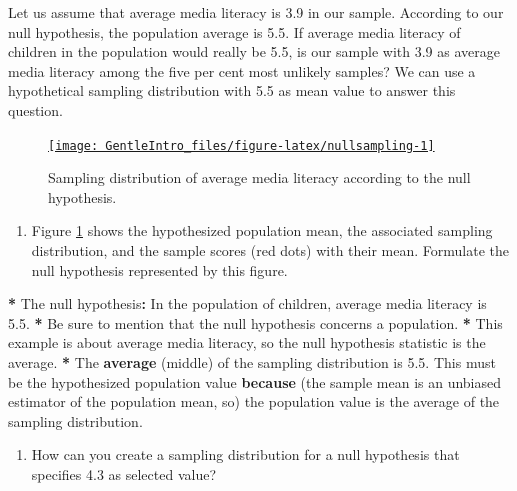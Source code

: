 \documentclass[a4paper]{book}
\newenvironment{Shaded}{\begin{snugshade}}{\end{snugshade}}
\newcommand{\KeywordTok}[1]{\textcolor[rgb]{0,0,0}{\textbf{#1}}}
\newcommand{\FloatTok}[1]{\textcolor[rgb]{0.00,0.00,0.00}{#1}}
\newcommand{\StringTok}[1]{\textcolor[rgb]{0.00,0.00,0.00}{#1}}
\newcommand{\OperatorTok}[1]{\textcolor[rgb]{0.00,0.00,0.00}{\textbf{#1}}}
\newcommand{\NormalTok}[1]{#1}
\providecommand{\tightlist}{%
  \setlength{\itemsep}{0pt}\setlength{\parskip}{0pt}}
\theoremstyle{definition}
\theoremstyle{definition}
\theoremstyle{definition}
\theoremstyle{remark}
\begin{document}
Let us assume that average media literacy is 3.9 in our sample.
According to our null hypothesis, the population average is 5.5. If
average media literacy of children in the population would really be
5.5, is our sample with 3.9 as average media literacy among the five per
cent most unlikely samples? We can use a hypothetical sampling
distribution with 5.5 as mean value to answer this question.

\begin{figure}[H]
\href{http://82.196.4.233:3838/apps/nullsampling/}{\texttt{[image: GentleIntro\_files/figure-latex/nullsampling-1]} }\caption{Sampling distribution of average media literacy according to the null hypothesis.}\label{fig:nullsampling}
\end{figure}

\begin{enumerate}
\def\labelenumi{\arabic{enumi}.}
\tightlist
\item
  Figure \ref{fig:nullsampling} shows the hypothesized population mean,
  the associated sampling distribution, and the sample scores (red dots)
  with their mean. Formulate the null hypothesis represented by this
  figure.
\end{enumerate}

\begin{Shaded}
\begin{Highlighting}[]
\OperatorTok{*}\StringTok{ }\NormalTok{The null hypothesis}\OperatorTok{:}\StringTok{ }\NormalTok{In the population of children, average media literacy}
\NormalTok{is }\FloatTok{5.5}\NormalTok{.}
\OperatorTok{*}\StringTok{ }\NormalTok{Be sure to mention that the null hypothesis concerns a population.}
\OperatorTok{*}\StringTok{ }\NormalTok{This example is about average media literacy, so the null hypothesis}
\NormalTok{statistic is the average.}
\OperatorTok{*}\StringTok{ }\NormalTok{The }\KeywordTok{average}\NormalTok{ (middle) of the sampling distribution is }\FloatTok{5.5}\NormalTok{. This must be the}
\NormalTok{hypothesized population value }\KeywordTok{because}\NormalTok{ (the sample mean is an unbiased estimator}
\NormalTok{of the population mean, so) the population value is the average of the sampling}
\NormalTok{distribution.}
\end{Highlighting}
\end{Shaded}

\begin{enumerate}
\def\labelenumi{\arabic{enumi}.}
\setcounter{enumi}{1}
\tightlist
\item
  How can you create a sampling distribution for a null hypothesis that
  specifies 4.3 as selected value?
\end{enumerate}
\end{document}
